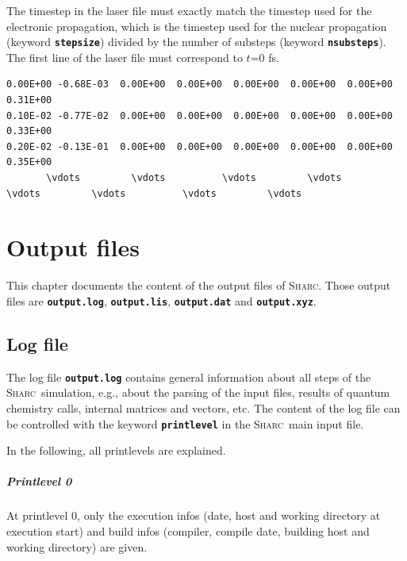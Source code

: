 \documentclass[a4paper,11pt,DIV=15,openany,twoside=false]{scrbook}
\newcommand{\sharc}{\textsc{Sharc}}
\newcommand{\ttt}[1]{\textbf{\texttt{#1}}}
\newenvironment{example}{
  \vspace{0mm}
  \definecolor{shadecolor}{HTML}{E4F4FF}
  \begin{shaded}
}{
  \end{shaded}
}
\begin{document}
The timestep in the laser file must exactly match the timestep used for the electronic propagation, which is the timestep used for the nuclear propagation (keyword \ttt{stepsize}) divided by the number of substeps (keyword \ttt{nsubsteps}). The first line of the laser file must correspond to $t$=0 fs.

\begin{example}
\begin{Verbatim}[commandchars=\\\{\}]
0.00E+00 -0.68E-03  0.00E+00  0.00E+00  0.00E+00  0.00E+00  0.00E+00  0.31E+00
0.10E-02 -0.77E-02  0.00E+00  0.00E+00  0.00E+00  0.00E+00  0.00E+00  0.33E+00
0.20E-02 -0.13E-01  0.00E+00  0.00E+00  0.00E+00  0.00E+00  0.00E+00  0.35E+00
       \vdots         \vdots          \vdots         \vdots          \vdots         \vdots          \vdots         \vdots
\end{Verbatim}
\end{example}


\chapter{Output files}\label{chap:output}

This chapter documents the content of the output files of \sharc. Those output files are \ttt{output.log}, \ttt{output.lis}, \ttt{output.dat} and \ttt{output.xyz}.

\section{Log file}\label{sec:logfile}

The log file \ttt{output.log} contains general information about all steps of the \sharc\ simulation, e.g., about the parsing of the input files, results of quantum chemistry calls, internal matrices and vectors, etc. The content of the log file can be controlled with the keyword \ttt{printlevel} in the \sharc\ main input file.

In the following, all printlevels are explained.

\paragraph{Printlevel 0}

At printlevel 0, only the execution infos (date, host and working directory at execution start) and build infos (compiler, compile date, building host and working directory) are given.
\end{document}
